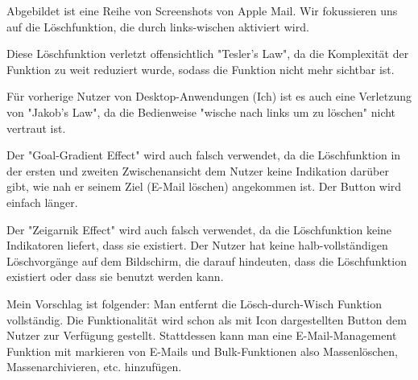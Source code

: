 \documentclass[a4paper,12pt]{article}
\begin{document}
Abgebildet ist eine Reihe von Screenshots von Apple Mail. Wir fokussieren
uns auf die Löschfunktion, die durch links-wischen aktiviert wird.

Diese Löschfunktion verletzt offensichtlich "Tesler's Law", da die Komplexität
der Funktion zu weit reduziert wurde, sodass die Funktion nicht mehr
sichtbar ist.

Für vorherige Nutzer von Desktop-Anwendungen (Ich) ist es auch eine Verletzung von "Jakob's Law",
da die Bedienweise "wische nach links um zu löschen" nicht vertraut ist.

Der "Goal-Gradient Effect" wird auch falsch verwendet, da die Löschfunktion
in der ersten und zweiten Zwischenansicht dem Nutzer keine Indikation darüber gibt, wie
nah er seinem Ziel (E-Mail löschen) angekommen ist. Der Button wird einfach länger.

Der "Zeigarnik Effect" wird auch falsch verwendet, da die Löschfunktion
keine Indikatoren liefert, dass sie existiert. Der Nutzer hat keine halb-vollständigen
Löschvorgänge auf dem Bildschirm, die darauf hindeuten, dass die Löschfunktion
existiert oder dass sie benutzt werden kann.

Mein Vorschlag ist folgender: Man entfernt die Lösch-durch-Wisch Funktion vollständig.
Die Funktionalität wird schon als mit Icon dargestellten Button dem Nutzer zur Verfügung
gestellt. Stattdessen kann man eine E-Mail-Management Funktion mit markieren von E-Mails
und Bulk-Funktionen also Massenlöschen, Massenarchivieren, etc. hinzufügen.
\end{document}
